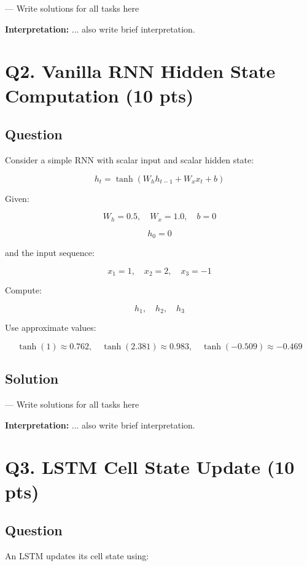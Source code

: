 \documentclass[11pt]{article}
\begin{document}
--- Write solutions for all tasks here 

\noindent \textbf{Interpretation:} ... also write brief interpretation.

\section*{Q2. Vanilla RNN Hidden State Computation (10 pts)}

\subsection*{Question}

Consider a simple RNN with scalar input and scalar hidden state:

\[
h_t = \tanh(W_hh_{t-1} + W_xx_t + b)
\]

Given:

\[
W_h = 0.5, \quad W_x = 1.0, \quad b = 0
\]

\[
h_0 = 0
\]

and the input sequence:

\[
x_1 = 1, \quad x_2 = 2, \quad x_3 = -1
\]

Compute:

\[
h_1, \quad h_2, \quad h_3
\]

Use approximate values:

\[
\tanh(1) \approx 0.762, \quad \tanh(2.381) \approx 0.983, \quad \tanh(-0.509) \approx -0.469
\]

\subsection*{Solution}

--- Write solutions for all tasks here 

\noindent \textbf{Interpretation:} ... also write brief interpretation.

\section*{Q3. LSTM Cell State Update (10 pts)}

\subsection*{Question}

An LSTM updates its cell state using:
\end{document}
